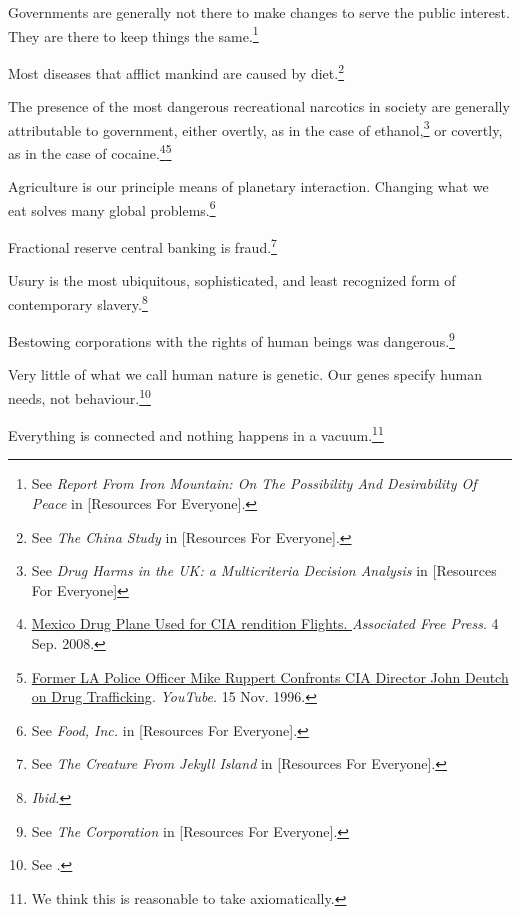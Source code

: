 \item
Governments are generally not there to make changes to serve the public interest. They are there to keep things the same.\footnote{See {\it Report From Iron Mountain: On The Possibility And Desirability Of Peace} in [Resources For Everyone].}

\item
Most diseases that afflict mankind are caused by diet.\footnote{See {\it The China Study} in [Resources For Everyone].}

\item
The presence of the most dangerous recreational narcotics in society are generally attributable to government, either overtly, as in the case of ethanol,\footnote{See {\it Drug Harms in the UK: a Multicriteria Decision Analysis} in [Resources For Everyone]} or covertly, as in the case of cocaine.\footnote{\href{http://afp.google.com/article/ALeqM5j6QonBKKMo2gw1e3ql-xUcQEZbVg}{Mexico Drug Plane Used for CIA rendition Flights. }{\it Associated Free Press}. 4 Sep. 2008.}\footnote{\href{http://www.youtube.com/watch?v=UT5MY3C86bk}{Former LA Police Officer Mike Ruppert Confronts CIA Director John Deutch on Drug Trafficking}. {\it YouTube}. 15 Nov. 1996.}

\item
Agriculture is our principle means of planetary interaction. Changing what we eat solves many global problems.\footnote{See {\it Food, Inc.} in [Resources For Everyone].}

\item
Fractional reserve central banking is fraud.\footnote{See {\it The Creature From Jekyll Island} in [Resources For Everyone].}

\item
Usury is the most ubiquitous, sophisticated, and least recognized form of contemporary slavery.\footnote{{\it Ibid.}}

\item
Bestowing corporations with the rights of human beings was dangerous.\footnote{See {\it The Corporation} in [Resources For Everyone].}

\item
Very little of what we call human nature is genetic. Our genes specify human needs, not behaviour.\footnote{See .}

\item
Everything is connected and nothing happens in a vacuum.\footnote{We think this is reasonable to take axiomatically.}
\stopitemize

